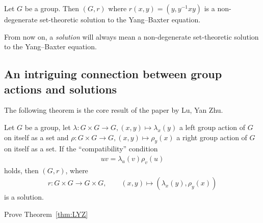     \begin{exercise}
         Let $G$ be a group. Then $(G,r)$ where $r(x,y)=(y, y^{-1}xy)$ is a 
         non-degenerate set-theoretic solution to the Yang--Baxter equation.
    \end{exercise}
    
    \begin{convention}
        From now on, a \emph{solution}  will always mean a non-degenerate set-theoretic solution to the Yang--Baxter equation.
    \end{convention}

\subsection{An intriguing connection between group actions and solutions}
    The following theorem is the core result of the paper \cite{LYZ00} by Lu, Yan Zhu.

    \begin{theorem}\label{thm:LYZ}
         Let $G$ be a group, let $\lambda: G\times G \to G, (x,y)\mapsto \lambda_x(y)$ a left group action of $G$ on itself as a set and $\rho: G\times G \to G, (x,y)\mapsto \rho_y(x)$ a right group action of $G$ on itself as a set. If the ``compatibility'' condition 
        \begin{align}\label{eq:LYZ}
            uv = \lambda_u(v)\rho_v(u)
        \end{align}
        holds, then $(G,r)$, where
        \begin{align*}
            r:G\times G \to G\times G, \qquad (x,y)\mapsto (\lambda_x(y),\rho_y(x))
        \end{align*}
        is a solution.
    \end{theorem}

    \begin{exercise}\label{ex:LYZ}
        Prove Theorem~\ref{thm:LYZ}
    \end{exercise}

